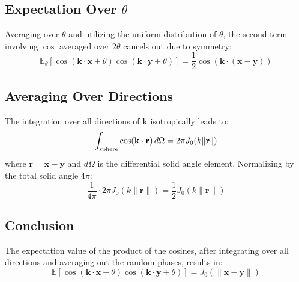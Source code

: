 \documentclass{article}
\newcommand{\tmop}[1]{\ensuremath{\operatorname{#1}}}
\begin{document}
\subsection{Expectation Over $\theta$}

Averaging over $\theta$ and utilizing the uniform distribution of $\theta$,
the second term involving $\cos$ averaged over $2 \theta$ cancels out due to
symmetry:
\begin{equation}
  \mathbb{E}_{\theta}  [\cos (\mathbf{k} \cdot \mathbf{x} + \theta) \cos
  (\mathbf{k} \cdot \mathbf{y} + \theta)] = \frac{1}{2} \cos (\mathbf{k} \cdot
  (\mathbf{x} - \mathbf{y}))
\end{equation}

\subsection{Averaging Over Directions}

The integration over all directions of $\mathbf{k}$ isotropically leads to:
\begin{equation}
  \int_{\tmop{sphere}} \cos (\mathbf{k} \cdot \mathbf{r})  \hspace{0.17em} d
  \Omega = 2 \pi J_0 (k\| \mathbf{r} \|)
\end{equation}
where $\mathbf{r} = \mathbf{x} - \mathbf{y}$ and $d \Omega$ is the
differential solid angle element. Normalizing by the total solid angle $4
\pi$:
\begin{equation}
  \frac{1}{4 \pi} \cdot 2 \pi J_0 (k\| \mathbf{r} \|) = \frac{1}{2} J_0 (k\|
  \mathbf{r} \|)
\end{equation}

\subsection{Conclusion}

The expectation value of the product of the cosines, after integrating over
all directions and averaging out the random phases, results in:
\begin{equation}
  \mathbb{E} [\cos (\mathbf{k} \cdot \mathbf{x} + \theta) \cos (\mathbf{k}
  \cdot \mathbf{y} + \theta)] = J_0 (\| \mathbf{x} - \mathbf{y} \|)
\end{equation}
\end{document}
